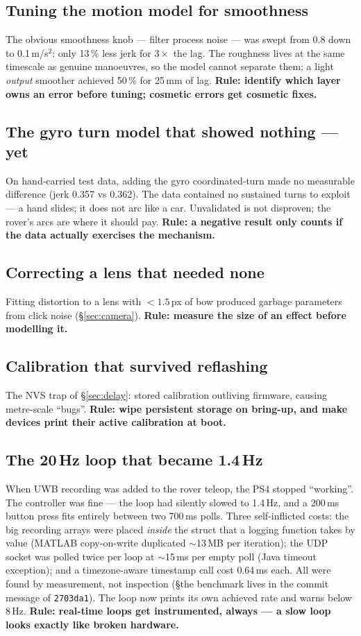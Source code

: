 \documentclass[11pt,a4paper]{article}
\newcommand{\code}[1]{\texttt{#1}}
\begin{document}
\subsection{Tuning the motion model for smoothness}
\label{sec:fail-smoothing}
The obvious smoothness knob --- filter process noise --- was swept from 0.8 down
to 0.1\,m/s$^2$: only 13\,\% less jerk for $3\times$ the lag. The roughness lives
at the same timescale as genuine manoeuvres, so the model cannot separate them; a
light \emph{output} smoother achieved 50\,\% for 25\,mm of lag.
\textbf{Rule: identify which layer owns an error before tuning; cosmetic errors
get cosmetic fixes.}

\subsection{The gyro turn model that showed nothing --- yet}
On hand-carried test data, adding the gyro coordinated-turn made no measurable
difference (jerk 0.357 vs 0.362). The data contained no sustained turns to
exploit --- a hand slides; it does not arc like a car. Unvalidated is not
disproven; the rover's arcs are where it should pay. \textbf{Rule: a negative
result only counts if the data actually exercises the mechanism.}

\subsection{Correcting a lens that needed none}
Fitting distortion to a lens with $<1.5$\,px of bow produced garbage parameters
from click noise (\S\ref{sec:camera}). \textbf{Rule: measure the size of an effect
before modelling it.}

\subsection{Calibration that survived reflashing}
The NVS trap of \S\ref{sec:delay}: stored calibration outliving firmware, causing
metre-scale ``bugs''. \textbf{Rule: wipe persistent storage on bring-up, and make
devices print their active calibration at boot.}

\subsection{The 20\,Hz loop that became 1.4\,Hz}
\label{sec:fail-loop}
When UWB recording was added to the rover teleop, the PS4 stopped ``working''.
The controller was fine --- the loop had silently slowed to 1.4\,Hz, and a 200\,ms
button press fits entirely between two 700\,ms polls. Three self-inflicted costs:
the big recording arrays were placed \emph{inside} the struct that a logging
function takes by value (MATLAB copy-on-write duplicated $\sim$13\,MB per
iteration); the UDP socket was polled twice per loop at $\sim$15\,ms per empty
poll (Java timeout exception); and a timezone-aware timestamp call cost 0.64\,ms
each. All were found by measurement, not inspection
(\S the benchmark lives in the commit message of \code{2703da1}). The loop now
prints its own achieved rate and warns below 8\,Hz.
\textbf{Rule: real-time loops get instrumented, always --- a slow loop looks
exactly like broken hardware.}
\end{document}
